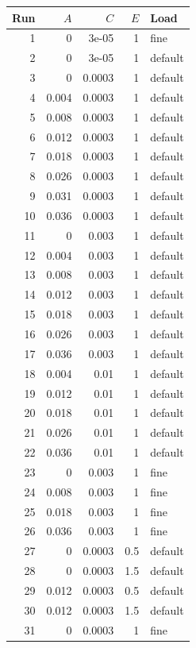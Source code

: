 \begin{longtable}{rrrrl}
\toprule Run & $A$ & $C$ & $E$ & Load \\ \midrule\endhead
1 & 0 & 3e-05 & 1 & fine \\
2 & 0 & 3e-05 & 1 & default \\
3 & 0 & 0.0003 & 1 & default \\
4 & 0.004 & 0.0003 & 1 & default \\
5 & 0.008 & 0.0003 & 1 & default \\
6 & 0.012 & 0.0003 & 1 & default \\
7 & 0.018 & 0.0003 & 1 & default \\
8 & 0.026 & 0.0003 & 1 & default \\
9 & 0.031 & 0.0003 & 1 & default \\
10 & 0.036 & 0.0003 & 1 & default \\
11 & 0 & 0.003 & 1 & default \\
12 & 0.004 & 0.003 & 1 & default \\
13 & 0.008 & 0.003 & 1 & default \\
14 & 0.012 & 0.003 & 1 & default \\
15 & 0.018 & 0.003 & 1 & default \\
16 & 0.026 & 0.003 & 1 & default \\
17 & 0.036 & 0.003 & 1 & default \\
18 & 0.004 & 0.01 & 1 & default \\
19 & 0.012 & 0.01 & 1 & default \\
20 & 0.018 & 0.01 & 1 & default \\
21 & 0.026 & 0.01 & 1 & default \\
22 & 0.036 & 0.01 & 1 & default \\
23 & 0 & 0.003 & 1 & fine \\
24 & 0.008 & 0.003 & 1 & fine \\
25 & 0.018 & 0.003 & 1 & fine \\
26 & 0.036 & 0.003 & 1 & fine \\
27 & 0 & 0.0003 & 0.5 & default \\
28 & 0 & 0.0003 & 1.5 & default \\
29 & 0.012 & 0.0003 & 0.5 & default \\
30 & 0.012 & 0.0003 & 1.5 & default \\
31 & 0 & 0.0003 & 1 & fine \\
\bottomrule\end{longtable}
